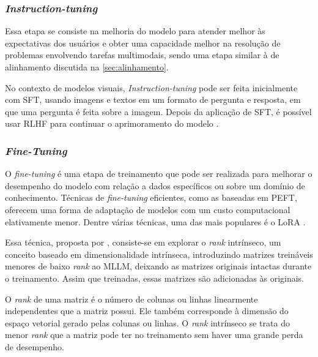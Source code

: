 \subsubsection{\textit{Instruction-tuning}}

Essa etapa se consiste na melhoria do modelo para atender melhor às expectativas dos usuários e obter uma capacidade
melhor na resolução de problemas envolvendo tarefas multimodais, sendo uma etapa similar à de alinhamento discutida na
\autoref{sec:alinhamento}.

No contexto de modelos visuais, \textit{Instruction-tuning} pode ser feita inicialmente com \ac{SFT}, usando imagens e
textos em um formato de pergunta e resposta, em que uma pergunta é feita sobre a imagem. Depois da aplicação de
\ac{SFT}, é possível usar \ac{RLHF} para continuar o aprimoramento do modelo \cite{mllm_survey_2024}.

\subsubsection{\textit{Fine-Tuning}} %

O \textit{fine-tuning} é uma etapa de treinamento que pode ser realizada para melhorar o desempenho do modelo com
relação a dados específicos ou sobre um domínio de conhecimento. Técnicas de \textit{fine-tuning} eficientes, como as
baseadas em \ac{PEFT}, oferecem uma forma de adaptação de modelos com um custo computacional elativamente menor. Dentre
várias técnicas, uma das mais populares é o \ac{LoRA} \cite{llm_survey_2023}.


Essa técnica, proposta por \textcite{hu2021lora}, consiste-se em explorar o \textit{rank} intrínseco, um conceito
baseado em dimensionalidade intrínseca, introduzindo matrizes treináveis menores de baixo \textit{rank} ao \ac{MLLM},
deixando as matrizes originais intactas durante o treinamento. Assim que treinadas, essas matrizes são adicionadas às
originais.

O \textit{rank} de uma matriz é o número de colunas ou linhas linearmente independentes que a matriz possui. Ele também
corresponde à dimensão do espaço vetorial gerado pelas colunas ou linhas. O \textit{rank} intrínseco se trata do menor
\textit{rank} que a matriz pode ter no treinamento sem haver uma grande perda de desempenho.

